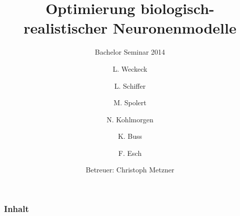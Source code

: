 \documentclass[12pt]{beamer}
\title{Optimierung biologisch-realistischer Neuronenmodelle}
\subtitle{Bachelor Seminar 2014}
\author{L. Weckeck \and L. Schiffer \and M. Spolert \and N. Kohlmorgen \and K. Buss \and F. Esch}
\institute{
  Institut für Robotik und Kognitive Systeme\\
  Universität zu Lübeck
}
\date{Betreuer: Christoph Metzner}
\begin{document}
\begin{frame}
  \titlepage
\end{frame}

\begin{frame}
  \frametitle{Inhalt}
  \tableofcontents
\end{frame}




\end{document}
